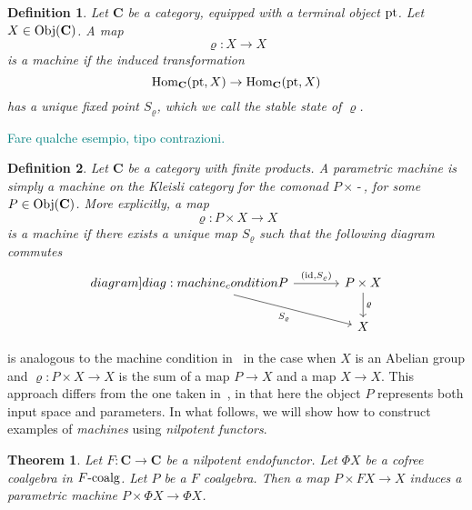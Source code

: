 \documentclass[12pt]{article}
\newtheorem{theorem}{Theorem}
\newtheorem{definition}{Definition}
\newcommand{\pietro}[1]{\textcolor{teal}{#1}}
\newcommand{\pt}{{\textnormal{pt}}}
\newcommand{\Hom}{{\textnormal{Hom}}}
\newcommand{\Obj}{{\textnormal{Obj}}}
\newcommand{\id}{{\textnormal{id}}}
\newcommand{\Cat}{{\mathbf{C}}}
\newcommand{\FCoalg}{{F\textnormal{-coalg}}}
\newcommand{\anon}{{\,\mbox{-}\,}}
\begin{document}
\begin{definition}\label{def:machine}
    Let $\Cat$ be a category, equipped with a terminal object $\pt$. Let $X \in \Obj(\Cat)$. A map
    \begin{equation*}
        \varrho \colon X \rightarrow X
    \end{equation*}
    is a {\em machine} if the induced transformation
    \begin{equation*}
        \Hom_\Cat(\pt, X) \rightarrow \Hom_\Cat(\pt, X)
    \end{equation*}
    has a unique fixed point $S_\varrho$, which we call the {\em stable state} of $\varrho$.
\end{definition}

\pietro{Fare qualche esempio, tipo contrazioni.}

\begin{definition}\label{def:parametric_machine}
    Let $\Cat$ be a category with finite products. A {\em parametric machine} is simply a machine on the Kleisli category for the comonad $P \times \anon$, for some $P \in \Obj(\Cat)$. More explicitly, a map
    \begin{equation*}
        \varrho \colon P \times X \rightarrow X
    \end{equation*}
    is a {\em machine} if there exists a unique map $S_\varrho$ such that the following diagram commutes
    \begin{equation}
        \begin{tikzcd}[column sep=large]\label[diagram]{diag:machine_condition}
            P \arrow[rightarrow]{r}{\left(\id, S_\varrho\right)}
            \arrow[rightarrow,swap]{dr}{S_\varrho}
            & P \times X \arrow[rightarrow]{d}{\varrho} \\
            & X
        \end{tikzcd}
    \end{equation}
\end{definition}

 is analogous to the machine condition in~\cite{2020arXiv200702777V} in the case when $X$ is an Abelian group and $\varrho\colon P \times X \rightarrow X$ is the sum of a map $P \rightarrow X$ and a map $X \rightarrow X$. This approach differs from the one taken in~\cite{2020arXiv200702777V}, in that here the object $P$ represents both input space and parameters. In what follows, we will show how to construct examples of {\em machines} using {\em nilpotent functors}.

\begin{theorem}\label{thm:nilpotent_architecture}
    Let $F\colon \Cat \rightarrow \Cat$ be a nilpotent endofunctor. Let $\Phi X$ be a cofree coalgebra in $\FCoalg$. Let $P$ be a $F$ coalgebra. Then a map $P \times F X \rightarrow X$ induces a parametric machine $P \times \Phi X \rightarrow \Phi X$.
\end{theorem}
\end{document}
